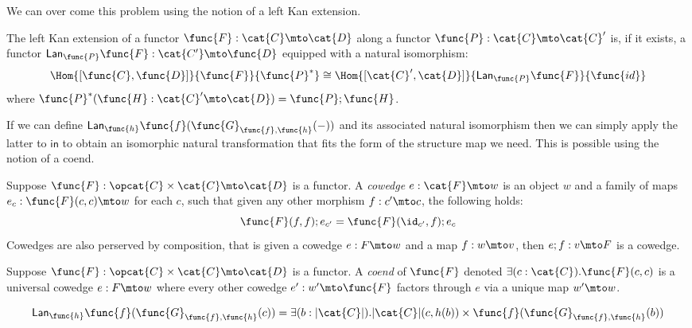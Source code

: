 We can over come this problem using the notion of a left Kan
extension. 
\newcommand{\Lan}[2]{\mathsf{Lan}_{#1}#2}
\begin{definition}
\label{def:left_kan_extension}
The left Kan extension of a functor $\func{F} : \cat{C} \mto \cat{D}$
along a functor $\func{P} : \cat{C} \mto \cat{C}'$ is, if it exists, a
functor $\Lan{\func{P}}{\func{F}} : \cat{C'} \mto \func{D}$ equipped
with a natural isomorphism:
\[
    \Hom{[\func{C},\func{D}]}{\func{F}}{\func{P}^*} \cong \Hom{[\cat{C}',\cat{D}]}{\Lan{\func{P}}{\func{F}}}{\func{id}}
\]
where $\func{P}^*(\func{H} : \cat{C}' \mto \cat{D}) = \func{P};\func{H}$.
\end{definition}
\noindent
If we can define
$\Lan{\func{h}}{\func{f}(\func{G}_{\func{f},\func{h}}(-))}$ and its
associated natural isomorphism then we can simply apply the latter to
$\mathsf{in}$ to obtain an isomorphic natural transformation that fits
the form of the structure map we need. This is possible using the
notion of a coend.
\begin{definition}[Cowedge]
\label{def:cowedge}
Suppose $\func{F} : \opcat{C} \times \cat{C} \mto \cat{D}$ is a
functor. A \emph{cowedge} $e : \cat{F} \mto w$ is an object $w$ and a
family of maps $e_c : \func{F}(c,c) \mto w$ for each $c$, such that
given any other morphism $f : c' \mto c$, the following holds:
\[
    \func{F}(f,f);e_{c'} = \func{F}(\id_{c'},f);e_{c}
\]
Cowedges are also perserved by composition, that is given a cowedge $e
: F \mto w$ and a map $f : w \mto v$, then $e;f : v \mto F$ is a
cowedge.
\end{definition}

\begin{definition}[Coend]
\label{def:coend}
Suppose $\func{F} : \opcat{C} \times \cat{C} \mto \cat{D}$ is a
functor. A \emph{coend} of $\func{F}$ denoted 
$\exists(c : \cat{C}).\func{F}(c,c)$ 
is a universal cowedge $e : F \mto w$ where every other cowedge $e' :
w' \mto \func{F}$ factors through $e$ via a unique map $w' \mto w$.
\end{definition}

\[
\Lan{\func{h}}{\func{f}(\func{G}_{\func{f},\func{h}}(c))} =
\exists(b : |\cat{C}|).|\cat{C}|(c,h(b)) \times \func{f}(\func{G}_{\func{f},\func{h}}(b))
\]

